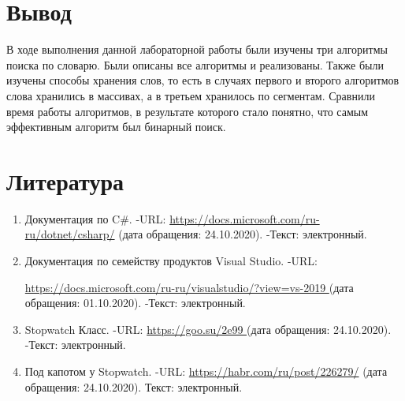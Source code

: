 \documentclass[14pt, a4paper]{extarticle}
\begin{document}
\section{Вывод}
В ходе выполнения данной лабораторной работы были изучены три алгоритмы поиска по словарю. Были описаны все алгоритмы и реализованы. Также были изучены способы хранения слов, то есть в случаях первого и второго алгоритмов слова хранились в массивах, а в третьем хранилось по сегментам. Сравнили время работы алгоритмов, в результате которого стало понятно, что самым эффективным алгоритм был бинарный поиск.
\clearpage
\section*{Литература}
\begin{enumerate}
	\label{literature}
	\item  Документация по C\#. -URL: \href{https://docs.microsoft.com/ru-ru/dotnet/csharp/}{https://docs.microsoft.com/ru-ru/dotnet/csharp/} (дата обращения: 24.10.2020). -Текст: электронный.
	\item Документация по семейству продуктов Visual Studio. -URL:\par \href{https://docs.microsoft.com/ru-ru/visualstudio/?view=vs-2019}{https://docs.microsoft.com/ru-ru/visualstudio/?view=vs-2019 } (дата обращения: 01.10.2020). -Текст: электронный.
	\item Stopwatch Класс. -URL: \href{https://goo.su/2e99}{https://goo.su/2e99 } (дата обращения: 24.10.2020). -Текст: электронный.
	\item Под капотом у Stopwatch. -URL:  \href{https://habr.com/ru/post/226279/}{https://habr.com/ru/post/226279/} (дата обращения: 24.10.2020). Текст: электронный.
\end{enumerate}
\end{document}
